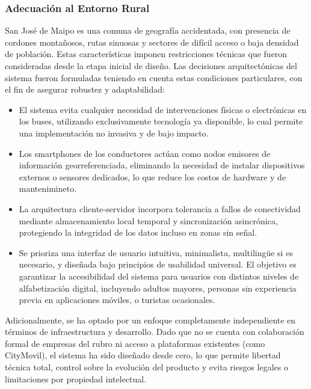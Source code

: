 \documentclass[12pt]{article}
\begin{document}
\subsubsection{Adecuación al Entorno Rural}
San José de Maipo es una comuna de geografía accidentada, con presencia de cordones montañosos, rutas sinuosas y sectores de difícil acceso o baja densidad de población. Estas características imponen restricciones técnicas que fueron consideradas desde la etapa inicial de diseño. Las decisiones arquitectónicas del sistema fueron formuladas teniendo en cuenta estas condiciones particulares, con el fin de asegurar robustez y adaptabilidad: 
\begin{itemize}
    \item El sistema evita cualquier necesidad de intervenciones físicas o electrónicas en los buses, utilizando exclusivamente tecnología ya disponible, lo cual permite una implementación no invasiva y de bajo impacto.
    \item Los smartphones de los conductores actúan como nodos emisores de información georreferenciada, eliminando la necesidad de instalar dispositivos externos o sensores dedicados, lo que reduce los costos de hardware y de mantenimineto.
    \item La arquitectura cliente-servidor incorpora tolerancia a fallos de conectividad mediante almacenamiento local temporal y sincronización asincrónica, protegiendo la integridad de los datos incluso en zonas sin señal. 
    \item Se prioriza una interfaz de usuario intuitiva, minimalista, multilingüe si es necesario, y diseñada bajo principios de usabilidad universal. El objetivo es garantizar la accesibilidad del sistema para usuarios con distintos niveles de alfabetización digital, incluyendo adultos mayores, personas sin experiencia previa en aplicaciones móviles, o turistas ocasionales. 
\end{itemize}
Adicionalmente, se ha optado por un enfoque completamente independiente en términos de infraestructura y desarrollo. Dado que no se cuenta con colaboración formal de empresas del rubro ni acceso a plataformas existentes (como CityMovil), el sistema ha sido diseñado desde cero, lo que permite libertad técnica total, control sobre la evolución del producto y evita riesgos legales o limitaciones por propiedad intelectual. 
\newpage
\end{document}
